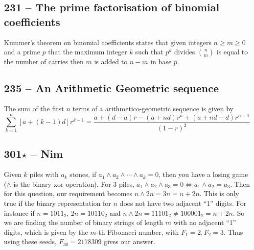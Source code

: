 \documentclass{article}
\begin{document}
\subsection*{231 -- The prime factorisation of binomial coefficients} 
Kummer's theorem on binomial coefficients states that given integers $n \geq m \geq 0$ and a prime $p$ that the maximum integer $k$ such that $p^k$ divides $\binom{n}{m}$ is equal to the number of carries then $m$ is added to $n-m$ in base $p$.

\subsection*{235 -- An Arithmetic Geometric sequence} 
The sum of the first $n$ terms of a arithmetico-geometric sequence is given by
\[ \sum\limits_{k=1}^n [a+(k-1)d]r^{k-1} = \frac{a + (d-a)r - (a+nd)r^n +(a+nd-d)r^{n+1}}{(1-r)^2}\]

\subsection*{301$\star$ -- Nim} 
Given $k$ piles with $a_k$ stones, if $a_1 \wedge a_2 \wedge \dotsb \wedge a_k = 0$, then you have a losing game ($\wedge$ is the binary xor operation). 
For 3 piles, $a_1 \wedge a_2 \wedge a_3 = 0 \iff a_1 \wedge a_2 = a_3$. 
Then for this question, our requirement becomes $n \wedge 2n = 3n = n + 2n$. 
This is only true if the binary representation for $n$ does not have two adjacent ``1'' digits. 
For instance if $n = 1011_2$, $2n = 10110_2$ and $n \wedge 2n = 11101_2 \neq 100001_2 = n+2n$. 
So we are finding the number of binary strings of length $m$ with no adjacent ``1'' digits, which is given by the $m$-th Fibonacci number, with $F_1 = 2, F_2 = 3$. 
Thus using these seeds, $F_{30} = \boxed{2178309}$ gives our answer.
\end{document}
